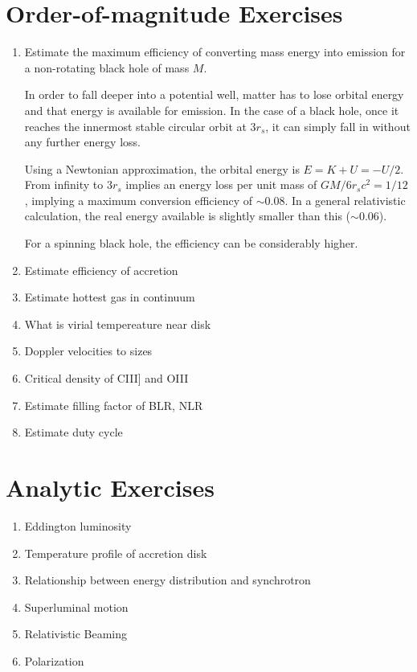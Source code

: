 \section{Order-of-magnitude Exercises}

\begin{enumerate} 
\item Estimate the maximum efficiency of converting mass energy
    into emission for a non-rotating black hole of mass $M$.

\begin{answer}
In order to fall deeper into a potential well, matter has to lose
orbital energy and that energy is available for emission. In the case
of a black hole, once it reaches the innermost stable circular orbit
at $3r_s$, it can simply fall in without any further energy loss.

Using a Newtonian approximation, the orbital energy is $E = K + U =
-U/2$. From infinity to $3r_s$ implies an energy loss per unit mass of
$GM/6r_sc^2 = 1 / 12$, implying a maximum conversion efficiency of
$\sim 0.08$. In a general relativistic calculation, the real energy
available is slightly smaller than this ($\sim 0.06$).

For a spinning black hole, the efficiency can be considerably higher.
\end{answer}

\item Estimate efficiency of accretion
\item Estimate hottest gas in continuum
\item What is virial tempereature near disk
\item Doppler velocities to sizes
\item Critical density of CIII] and OIII
\item Estimate filling factor of BLR, NLR
\item Estimate duty cycle
\end{enumerate} 

\section{Analytic Exercises}

\begin{enumerate}
\item Eddington luminosity
\item Temperature profile of accretion disk
\item Relationship between energy distribution and synchrotron
\item Superluminal motion
\item Relativistic Beaming
\item Polarization
\end{enumerate}

